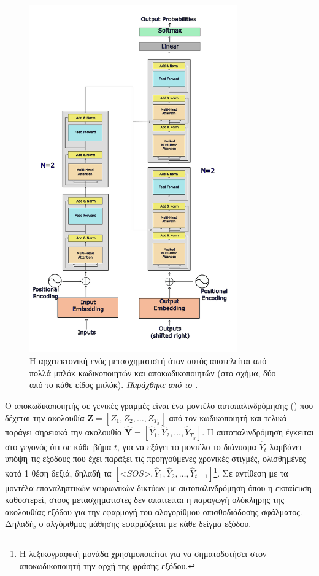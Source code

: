 \begin{figure}[p]
  \centering
  \includegraphics[width=0.8\textwidth]{images/chapter theoritical background/transformer_many_to_many.pdf}
  \caption{Η αρχιτεκτονική ενός μετασχηματιστή \cite{transformers_attention_is_all_you_need} όταν αυτός αποτελείται από πολλά μπλόκ κωδικοποιητών και αποκωδικοποιητών (στο σχήμα, δύο από το κάθε είδος μπλόκ). \textit{Παράχθηκε από το \href{https://inkscape.org/}{}}.}
  \label{fig:transformer_many_many}
\end{figure}

Ο αποκωδικοποιητής σε γενικές γραμμές είναι ένα μοντέλο αυτοπαλινδρόμησης () που δέχεται την ακολουθία $\boldsymbol{Z} = [Z_1, Z_2, \dots, Z_{T_x}]$ από τον κωδικοποιητή και τελικά παράγει σηρειακά την ακολουθία $\boldsymbol{\hat{Y}} = [\hat{Y}_1, \hat{Y}_2, \dots, \hat{Y}_{T_y}]$. Η αυτοπαλινδρόμηση έγκειται στο γεγονός ότι σε κάθε βήμα $t$, για να εξάγει το μοντέλο το διάνυσμα $\hat{Y}_t$ λαμβάνει υπόψη τις εξόδους που έχει παράξει τις προηγούμενες χρόνικές στιγμές, ολισθημένες κατά 1 θέση δεξιά, δηλαδή τα $[\mathbin{<}SOS\mathbin{>}, \hat{Y}_1, \hat{Y}_2, \dots, \hat{Y}_{t-1}]$\footnote{Η λεξικογραφική μονάδα  χρησιμοποιείται για να σηματοδοτήσει στον αποκωδικοποιητή την αρχή της φράσης εξόδου.}. Σε αντίθεση με τα μοντέλα επαναληπτικών νευρωνικών δικτύων με αυτο\textendash παλινδρόμηση όπου η εκπαίευση καθυστερεί, στους μετασχηματιστές δεν απαιτείται η παραγωγή ολόκληρης της ακολουθίας εξόδου για την εφαρμογή του αλογορίθμου οπισθοδιάδοσης σφάλματος. Δηλαδή, ο αλγόριθμος μάθησης εφαρμόζεται με κάθε δείγμα εξόδου.\par

